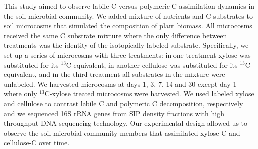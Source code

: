 This study aimed to observe labile C versus polymeric C assimilation dynamics
in the soil microbial community. We added mixture of nutrients and
C substrates to soil microcosms that simulated the composition of plant
biomass. All microcosms received the same C substrate mixture where the only
difference between treatments was the identity of the isotopically
labeled substrate. Specifically, we set up a series of microcosms with three
treatments: in one treatment xylose was substituted for its
$^{13}$C-equivalent, in another cellulose was substituted for its
$^{13}$C-equivalent, and in the third treatment all substrates in the mixture
were unlabeled. We harvested microcosms at days 1, 3, 7, 14 and 30 except day
1 where only $^{13}$C-xylose treated microcosms were harvested. We used labeled
xylose and cellulose to contrast labile C and polymeric C decomposition,
respectively and we sequenced 16S rRNA genes from SIP density fractions with
high throughput DNA sequencing technology. Our experimental design allowed us
to observe the soil microbial community members that assimilated xylose-C and
cellulose-C over time.
